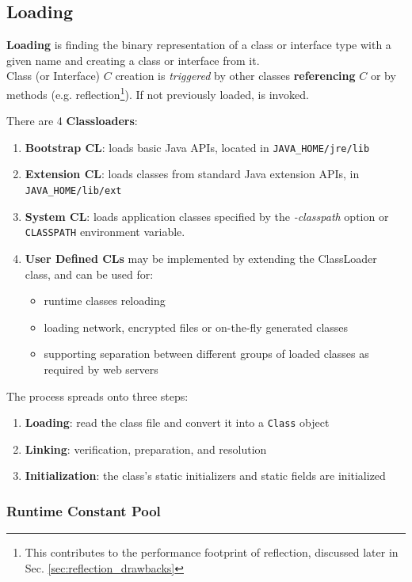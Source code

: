 \subsection{Loading}
\textbf{Loading} is finding the binary representation of a class or interface type with a given name and creating a class or interface from it.\\
Class (or Interface) $C$ creation is \textit{triggered} by other classes \textbf{referencing} $C$ or by methods (e.g. reflection\footnote{This contributes to the performance footprint of reflection, discussed later in Sec. \ref{sec:reflection_drawbacks}}).
If not previously loaded,  is invoked.
\nl

{There are 4 \textbf{Classloaders}:\ns
\begin{enumerate}
    \item \textbf{Bootstrap CL}: loads basic Java APIs, located in \texttt{JAVA\_HOME/jre/lib}
    \item \textbf{Extension CL}: loads classes from standard Java extension APIs, in \texttt{JAVA\_HOME/lib/ext}
    \item \textbf{System CL}: loads application classes specified by the \textit{-classpath} option or \texttt{CLASSPATH} environment variable.
    \item \textbf{User Defined CLs} may be implemented by extending the ClassLoader class, and can be used for:
    \begin{itemize}
        \item runtime classes reloading
        \item loading network, encrypted files or on-the-fly generated classes
        \item supporting separation between different groups of loaded classes as required by web servers
    \end{itemize}
\end{enumerate}}

{The process spreads onto three steps:\ns
\begin{enumerate}
    \item \textbf{Loading}: read the class file and convert it into a \lstinline|Class| object
    \item \textbf{Linking}: verification, preparation, and resolution
    \item \textbf{Initialization}: the class's static initializers and static fields are initialized
\end{enumerate}}

\subsubsection{Runtime Constant Pool}

